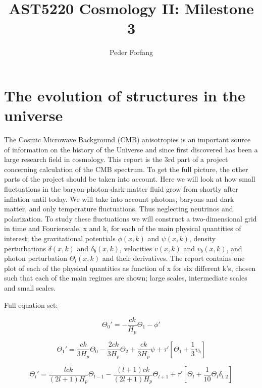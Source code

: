 \documentclass[norsk,a4paper,12pt]{article}
\begin{document}
\title{AST5220 Cosmology II: Milestone 3}
\author{Peder Forfang}
\maketitle


\section{The evolution of structures in the universe}

The Cosmic Microwave Background (CMB) anisotropies is an important source of information on the history of the Universe and since first discovered has been a large research field in cosmology. This report is the 3rd part of a project concerning calculation of the CMB spectrum. To get the full picture, the other parts of the project should be taken into account. Here we will look at how small fluctuations in the baryon-photon-dark-matter fluid grow from shortly after inflation until today. We will take into account  photons, baryons and dark matter, and only temperature fluctuations. Thus neglecting neutrinos and polarization. To study these fluctuations we will construct a two-dimensional grid in time and Fourierscale, x and k, for each of the main physical quantities of interest; the gravitational potentials $\phi(x,k)$ and $\psi(x,k)$, density perturbations $\delta(x,k)$ and $\delta_b(x,k)$, velocities $v(x,k)$ and $v_b(x,k)$, and photon perturbation $\Theta_l(x,k)$ and their derivatives. The report contains one plot of each of the physical quantities as function of x for six different k's, chosen such that each of the main regimes are shown; large scales, intermediate scales and small scales.

Full equation set: 

\begin{equation}
 \Theta_0' = -\frac{ck}{H_p}\Theta_1 - \phi'
\end{equation}


\begin{equation}
 \Theta_1' = \frac{ck}{3H_p}\Theta_0 - \frac{2ck}{3H_p}\Theta_2 + \frac{ck}{3H_p}\psi + \tau'[\Theta_1 + \frac{1}{3}v_b]
\end{equation}

\begin{equation}
 \Theta_l' = \frac{lck}{(2l +1)H_p}\Theta_{l-1} - \frac{(l+1)ck}{(2l +1)H_p}\Theta_{l+1} + \tau'[\Theta_l + \frac{1}{10}\Theta_l \delta_{l,2}]
\end{equation}
\end{document}
